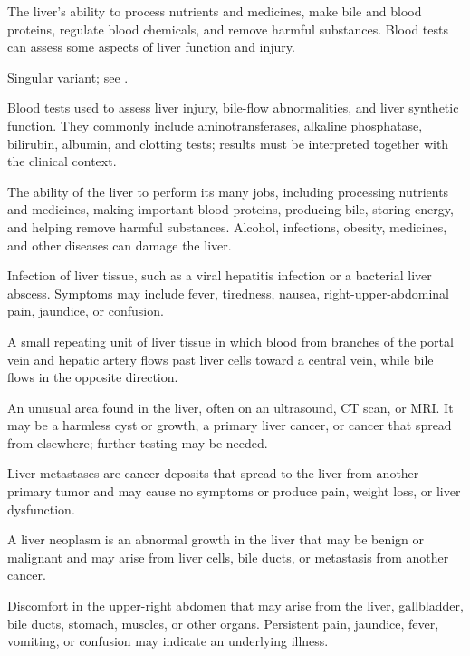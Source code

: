  The liver's ability to process nutrients and medicines, make bile and blood proteins, regulate blood chemicals, and remove harmful substances. Blood tests can assess some aspects of liver function and injury.

 Singular variant; see .

 Blood tests used to assess liver injury, bile-flow abnormalities, and liver synthetic function. They commonly
include aminotransferases, alkaline phosphatase, bilirubin, albumin, and clotting tests;
results must be interpreted together with the clinical context.

 The ability of the liver to perform its many jobs, including processing nutrients and medicines, making important blood proteins, producing bile, storing energy, and helping remove harmful substances. Alcohol, infections, obesity, medicines, and other diseases can damage the liver.

 Infection of liver tissue, such as a viral hepatitis infection or a bacterial liver abscess. Symptoms may include fever, tiredness, nausea, right-upper-abdominal pain, jaundice, or confusion.

 A small repeating unit of liver tissue in which blood from branches of the portal vein and hepatic artery flows past liver cells toward a central vein, while bile flows in the opposite direction.

 An unusual area found in the liver, often on an ultrasound, CT scan, or MRI. It may be a harmless cyst or growth, a primary liver cancer, or cancer that spread from elsewhere; further testing may be needed.

 Liver metastases are cancer deposits that spread to the liver from another primary tumor and may cause no symptoms or produce pain, weight loss, or liver dysfunction.

 A liver neoplasm is an abnormal growth in the liver that may be benign or malignant and may arise from liver cells, bile ducts, or metastasis from another cancer.

 Discomfort in the upper-right abdomen that may arise from the liver, gallbladder, bile ducts, stomach, muscles, or other organs. Persistent pain, jaundice, fever, vomiting, or confusion may indicate an underlying illness.

